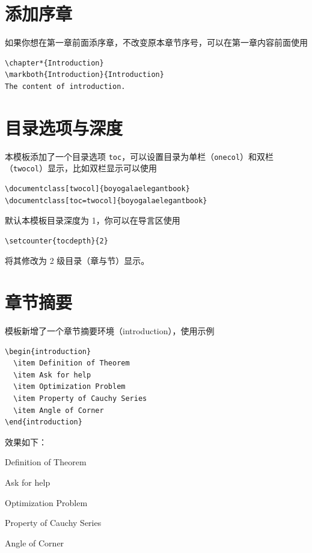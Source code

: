 \documentclass[lang=cn,10pt,scheme=chinese]{boyogalaelegantbook}
\begin{document}
\section{添加序章}

如果你想在第一章前面添序章，不改变原本章节序号，可以在第一章内容前面使用 
\begin{lstlisting}
\chapter*{Introduction}
\markboth{Introduction}{Introduction}
The content of introduction.
\end{lstlisting}

\section{目录选项与深度}
本模板添加了一个目录选项 \lstinline{toc}，可以设置目录为单栏（\lstinline{onecol}）和双栏（\lstinline{twocol}）显示，比如双栏显示可以使用
\begin{lstlisting}
\documentclass[twocol]{boyogalaelegantbook}
\documentclass[toc=twocol]{boyogalaelegantbook}
\end{lstlisting}

默认本模板目录深度为 1，你可以在导言区使用
\begin{lstlisting}
\setcounter{tocdepth}{2}
\end{lstlisting}
将其修改为 2 级目录（章与节）显示。


\section{章节摘要}
模板新增了一个章节摘要环境（introduction），使用示例
\begin{lstlisting}
\begin{introduction}
  \item Definition of Theorem
  \item Ask for help
  \item Optimization Problem
  \item Property of Cauchy Series
  \item Angle of Corner
\end{introduction}
\end{lstlisting}
效果如下：
\begin{introduction}
  \item Definition of Theorem
  \item Ask for help
  \item Optimization Problem
  \item Property of Cauchy Series
  \item Angle of Corner
\end{introduction}
\end{document}
